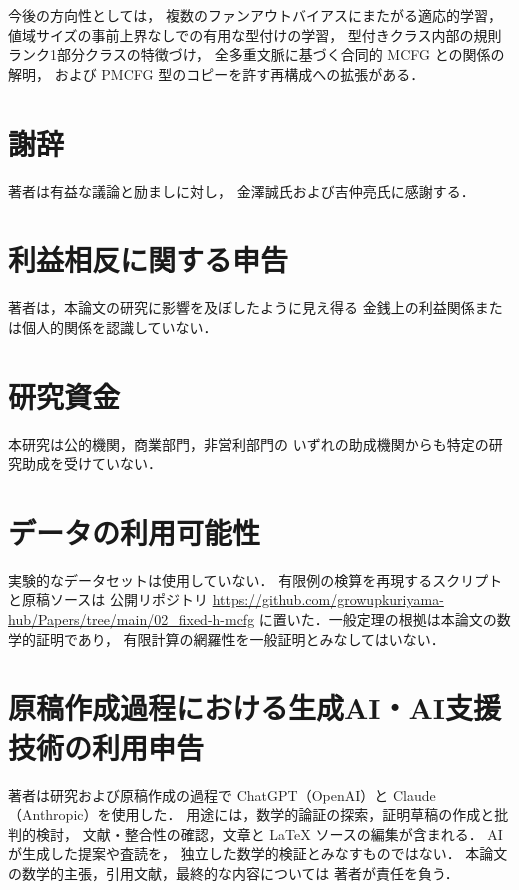 今後の方向性としては，
複数のファンアウトバイアスにまたがる適応的学習，
値域サイズの事前上界なしでの有用な型付けの学習，
型付きクラス内部の規則ランク1部分クラスの特徴づけ，
全多重文脈に基づく合同的 MCFG との関係の解明，
および PMCFG 型のコピーを許す再構成への拡張がある．

\section*{謝辞}
著者は有益な議論と励ましに対し，
金澤誠氏および吉仲亮氏に感謝する．

\section*{利益相反に関する申告}
著者は，本論文の研究に影響を及ぼしたように見え得る
金銭上の利益関係または個人的関係を認識していない．

\section*{研究資金}
本研究は公的機関，商業部門，非営利部門の
いずれの助成機関からも特定の研究助成を受けていない．

\section*{データの利用可能性}
実験的なデータセットは使用していない．
有限例の検算を再現するスクリプトと原稿ソースは
公開リポジトリ
\url{https://github.com/growupkuriyama-hub/Papers/tree/main/02_fixed-h-mcfg}
に置いた．一般定理の根拠は本論文の数学的証明であり，
有限計算の網羅性を一般証明とみなしてはいない．

\section*{原稿作成過程における生成AI・AI支援技術の利用申告}
著者は研究および原稿作成の過程で
ChatGPT（OpenAI）と Claude（Anthropic）を使用した．
用途には，数学的論証の探索，証明草稿の作成と批判的検討，
文献・整合性の確認，文章と LaTeX ソースの編集が含まれる．
AI が生成した提案や査読を，
独立した数学的検証とみなすものではない．
本論文の数学的主張，引用文献，最終的な内容については
著者が責任を負う．

\appendix

